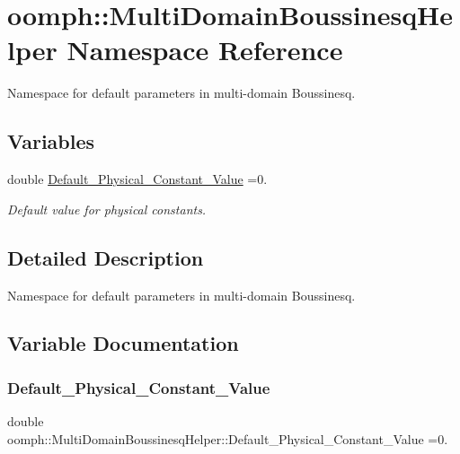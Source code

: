 \hypertarget{namespaceoomph_1_1MultiDomainBoussinesqHelper}{}\section{oomph\+:\+:Multi\+Domain\+Boussinesq\+Helper Namespace Reference}
\label{namespaceoomph_1_1MultiDomainBoussinesqHelper}


Namespace for default parameters in multi-\/domain Boussinesq.  


\subsection*{Variables}
\begin{DoxyCompactItemize}
\item 
double \hyperlink{namespaceoomph_1_1MultiDomainBoussinesqHelper_ae77c07b69cffe295ac07e2c25c31a8aa}{Default\+\_\+\+Physical\+\_\+\+Constant\+\_\+\+Value} =0.
\begin{DoxyCompactList}\small\item\em Default value for physical constants. \end{DoxyCompactList}\end{DoxyCompactItemize}


\subsection{Detailed Description}
Namespace for default parameters in multi-\/domain Boussinesq. 

\subsection{Variable Documentation}
\mbox{\label{namespaceoomph_1_1MultiDomainBoussinesqHelper_ae77c07b69cffe295ac07e2c25c31a8aa}} 
\subsubsection{\texorpdfstring{Default\+\_\+\+Physical\+\_\+\+Constant\+\_\+\+Value}{Default\_Physical\_Constant\_Value}}
{\footnotesize\ttfamily double oomph\+::\+Multi\+Domain\+Boussinesq\+Helper\+::\+Default\+\_\+\+Physical\+\_\+\+Constant\+\_\+\+Value =0.}



